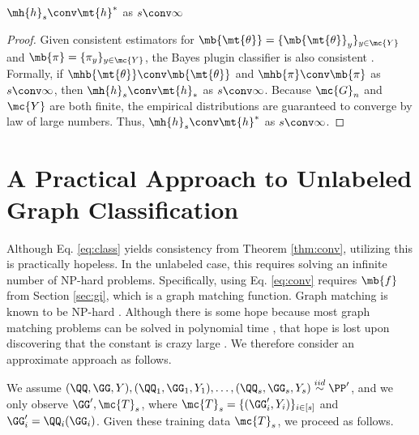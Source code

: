 \documentclass[10pt,journal,cspaper,compsoc]{IEEEtran}
\begin{document}
\begin{thm} \label{thm:conv}
	$\mh{h}_s \conv \mt{h}^*$ as $s \conv \infty$
\end{thm}

\begin{proof}
Given consistent estimators for $\mb{\mt{\theta}}=\{\mb{\mt{\theta}}_y\}_{y\in\mc{Y}}$ and $\mb{\pi}=\{\pi_y\}_{y \in \mc{Y}}$, the Bayes plugin classifier is also consistent \cite{DEV96}.  Formally, if $\mhb{\mt{\theta}} \conv \mb{\mt{\theta}}$ and $\mhb{\pi} \conv \mb{\pi}$ as $s \conv \infty$, then $\mh{h}_s \conv \mt{h}_*$ as $s\conv \infty$.  Because $\mc{G}_n$ and $\mc{Y}$ are both finite, the empirical distributions are guaranteed to converge by law of large numbers.  Thus, $\mh{h}_s \conv \mt{h}^*$ as $s \conv \infty$.
\end{proof}



\section{A Practical Approach to Unlabeled Graph Classification} %
\label{sec:a_practical_approach_to_unlabeled_graph_classification}

Although Eq. \ref{eq:class} yields consistency from Theorem \ref{thm:conv}, utilizing this is practically hopeless.  In the unlabeled case, this requires solving an infinite number of NP-hard problems.  Specifically, using Eq. \ref{eq:conv} requires $\mb{f}$ from Section \ref{sec:gi}, which is a graph matching function.  Graph matching is known to be NP-hard \cite{Conte04}.  Although there is some hope because most graph matching problems can be solved in polynomial time \cite{Conte04}, that hope is lost upon discovering that the constant is crazy large \cite{Conte04}.  We therefore consider an approximate approach as follows.

We assume $(\QQ,\GG,Y), (\QQ_1,\GG_1,Y_1),\ldots, (\QQ_s,\GG_s,Y_s) \overset{iid}{\sim} \PP'$, and we only observe $\GG', \mc{T}_s$, where  $\mc{T}_s=\{(\GG_i',Y_i)\}_{i \in [s]}$ and $\GG_i'=\QQ_i(\GG_i)$. Given these training data $\mc{T}_s$, we proceed as follows.  
\end{document}
